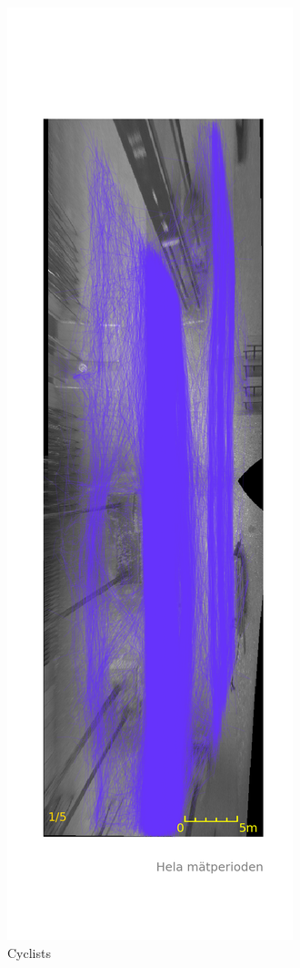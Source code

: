 \documentclass{article}
\begin{document}
\begin{figure}[H]
\centering
\begin{subfigure}{.3\textwidth}
  \centering
  \includegraphics[width=.5\linewidth]{data/Data_2.png}
  \caption{Cyclists}
  \label{fig:cyc_tra}
\end{subfigure}%
\begin{subfigure}{.3\textwidth}
  \centering

\end{subfigure}
\end{figure}
\end{document}
